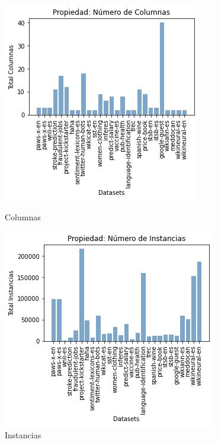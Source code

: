 \begin{figure}[!h]
    \begin{minipage}[b]{0.5\textwidth}
      
        \includegraphics[width=\textwidth]{Graphics/results/columns.png}
          \caption{Columnas}
          \label{fig:columns}
    \end{minipage}      
    \hspace{0.02cm}
    \begin{minipage}[b]{0.5\textwidth}
      
        \includegraphics[width=\textwidth]{Graphics/results/instances.png}
          \caption{Instancias}
          \label{fig:instances}
        \end{minipage} 
\end{figure}

